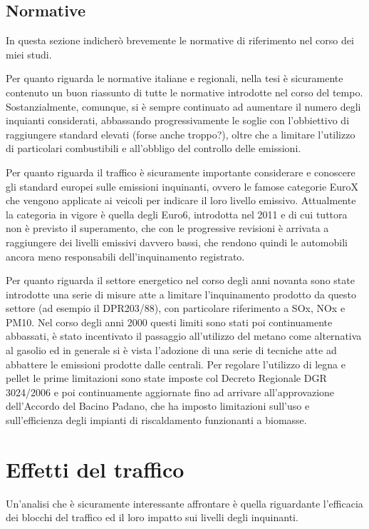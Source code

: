 \documentclass{article}
\begin{document}
\subsection{Normative}
\label{subsec:normative}
In questa sezione indicherò brevemente le normative di riferimento nel corso dei miei studi.

Per quanto riguarda le normative italiane e regionali, nella tesi\cite{scolari2017evoluzione} è sicuramente contenuto un buon riassunto di tutte le normative introdotte nel corso del tempo. Sostanzialmente, comunque, si è sempre continuato ad aumentare il numero degli inquianti considerati, abbassando progressivamente le soglie con l'obbiettivo di raggiungere standard elevati (forse anche troppo?), oltre che a limitare l'utilizzo di particolari combustibili e all'obbligo del controllo delle emissioni. 

Per quanto riguarda il traffico è sicuramente importante considerare e conoscere gli standard europei sulle emissioni inquinanti, ovvero le famose categorie EuroX che vengono applicate ai veicoli per indicare il loro livello emissivo. Attualmente la categoria in vigore è quella degli Euro6, introdotta nel 2011 e di cui tuttora non è previsto il superamento, che con le progressive revisioni è arrivata a raggiungere dei livelli emissivi davvero bassi, che rendono quindi le automobili ancora meno responsabili dell'inquinamento registrato. 

Per quanto riguarda il settore energetico nel corso degli anni novanta sono state introdotte una serie di misure atte a limitare l'inquinamento prodotto da questo settore (ad esempio il DPR203/88), con particolare riferimento a SOx, NOx e PM10. Nel corso degli anni 2000 questi limiti sono stati poi continuamente abbassati, è stato incentivato il passaggio all'utilizzo del metano come alternativa al gasolio ed in generale si è vista l'adozione di una serie di tecniche atte ad abbattere le emissioni prodotte dalle centrali. 
Per regolare l'utilizzo di legna e pellet le prime limitazioni sono state imposte col Decreto Regionale DGR 3024/2006 e poi continuamente aggiornate fino ad arrivare all'approvazione dell'Accordo del Bacino Padano, che ha imposto limitazioni sull'uso e sull'efficienza degli impianti di riscaldamento funzionanti a biomasse.


\section{Effetti del traffico}
Un'analisi che è sicuramente interessante affrontare è quella riguardante l'efficacia dei blocchi del traffico ed il loro impatto sui livelli degli inquinanti. 
\end{document}
